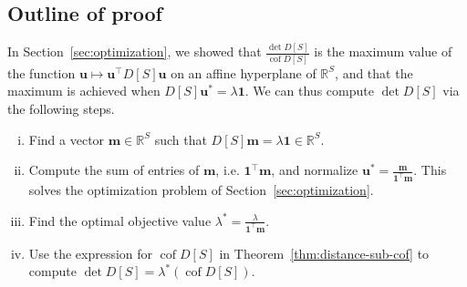 \documentclass{amsart}
\theoremstyle{definition}
\newcommand{\RR}{\mathbb{R}}
\newcommand{\bone}{\mathbf{1}}
\newcommand{\boldm}{\mathbf{m}}
\newcommand{\boldu}{\mathbf{u}}
\newcommand{\tr}{\intercal}
\DeclareMathOperator{\cof}{cof}
\begin{document}
\subsection{Outline of proof} 

In Section~\ref{sec:optimization}, we showed that $\displaystyle \frac{\det D[S]}{\cof D[S]}$ is the maximum value of the function $\boldu \mapsto \boldu^\tr D[S] \boldu$ on an affine hyperplane of $\RR^S$,
and that the maximum is achieved when $D[S] \boldu^* = \lambda \bone$.
We can thus compute $\det D[S]$ via the following steps.

\begin{enumerate}[(i)]
\item 
Find a vector $\boldm \in \RR^S$ such that $D[S]\boldm = \lambda \mathbf{1} \in \RR^S$.

\item 
Compute the sum of entries of $\boldm$, i.e. $\mathbf{1}^\tr \boldm$, and normalize
$\displaystyle
	\boldu^* = \frac{\boldm}{\bone^\tr \boldm}.
$
This solves the optimization problem of Section~\ref{sec:optimization}.

\item 
Find the optimal objective value
$\displaystyle
	\lambda^* = \frac{\lambda}{\bone^\tr \boldm}.
$


\item
Use the expression for $\cof D[S]$ in Theorem~\ref{thm:distance-sub-cof} to compute $\det D[S] = \lambda^* (\cof D[S])$.
\end{enumerate}
\end{document}
